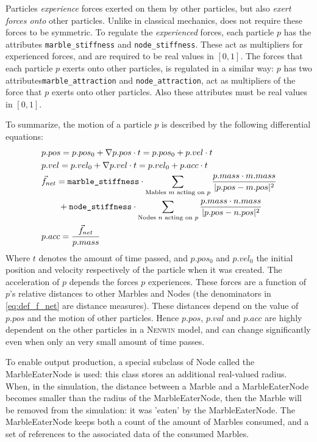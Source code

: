 Particles \textit{experience} forces exerted on them by other particles, but also \textit{exert forces onto} other particles. Unlike in classical mechanics, \nenwin does not require these forces to be symmetric. 
To regulate the \textit{experienced} forces, each particle $p$ has the attributes \texttt{marble\_stiffness} and \texttt{node\_stiffness}. These act as multipliers for experienced forces, and are required to be real values in $[0, 1]$.
The forces that each particle $p$ exerts onto other particles, is regulated in a similar way: $p$ has two attributes\texttt{marble\_attraction} and \texttt{node\_attraction}, act as multipliers of the force that $p$ exerts onto other particles. Also these attributes must be real values in $[0, 1]$. 

To summarize, the motion of a particle $p$ is described by the following differential equations:
\begin{align}
    &p.pos = p.pos_0 + \nabla p.pos \cdot t  = p.pos_0 + p.vel \cdot t \label{eq:def_pos} \\
    &p.vel = p.vel_0 + \nabla p.vel \cdot t = p.vel_0 + p.acc \cdot t \label{eq:def_vel}\\
    &\vec{f}_{net}  = \texttt{marble\_stiffness} \cdot \sum_{\text{Mables $m$ acting on $p$}} \frac{p.mass \cdot m.mass}{\lvert p.pos - m.pos \rvert^2} \nonumber \\
    & \qquad + \texttt{node\_stiffness} \cdot \sum_{\text{Nodes $n$ acting on $p$}} \frac{p.mass \cdot n.mass}{\lvert p.pos - n.pos \rvert^2} \label{eq:def_f_net}\\
    &p.acc = \frac{\vec{f}_{net}}{p.mass} \label{eq:def_acc}
\end{align}
Where $t$ denotes the amount of time passed, and $p.pos_0$ and $p.vel_0$ the initial position and velocity respectively of the particle when it was created.
The acceleration of $p$ depends the forces $p$ experiences. These forces are a function of $p$'s relative distances to other Marbles and Nodes (the denominators in \eqref{eq:def_f_net} are distance measures). These distances depend on the value of $p.pos$ and the motion of other particles. Hence $p.pos$, $p.val$ and $p.acc$ are highly dependent on the other particles in a \textsc{Nenwin} model, and can change significantly even when only an very small amount of time passes.

To enable output production, a special subclass of Node called the MarbleEaterNode is used: this class stores an additional real-valued radius. When, in the simulation, the distance between a Marble and a MarbleEaterNode becomes smaller than the radius of the MarbleEaterNode, then the Marble will be removed from the simulation: it was 'eaten' by the MarbleEaterNode. The MarbleEaterNode keeps both a count of the amount of Marbles consumed, and a set of references to the associated data of the consumed Marbles.

